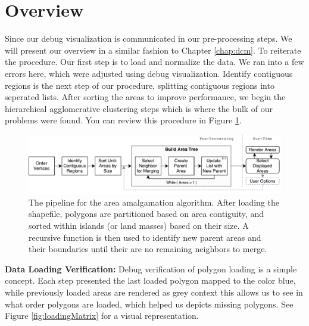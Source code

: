 \section{Overview}
Since our debug visualization is communicated in our pre-processing steps. We will present  our overview in a similar fashion to Chapter \ref{chap:dcm}. To reiterate the procedure. Our first step is to load and normalize the data. We ran into a few errors here, which were adjusted using debug visualization. Identify contiguous regions is the next step of our procedure, splitting contiguous regions into seperated lists. After sorting the areas to improve performance, we begin the hierarchical agglomerative clustering steps which is where the bulk of our problems were found. You can review this procedure in Figure \ref{fig:procedure6}.\\
\begin{figure}[t] 
\centering
\includegraphics[width=1\textwidth]{images/HorizontalFlow2}
\caption{ The pipeline for the area amalgamation algorithm. After loading the shapefile, polygons are partitioned based on area contiguity, and sorted within islands (or land masses) based on their size. A recursive function is then used to identify new parent areas and their boundaries until their are no remaining neighbors to merge. } \label{fig:procedure6} \vspace{-0.2cm}
\end{figure}
\textbf{Data Loading Verification: }Debug verification of polygon loading is a simple concept. Each step presented the last loaded polygon mapped to the color blue, while previously loaded areas are rendered as grey context this allows us to see in what order polygons are loaded, which helped us depicts missing polygons. See Figure \ref{fig:loadingMatrix} for a visual representation.\\
